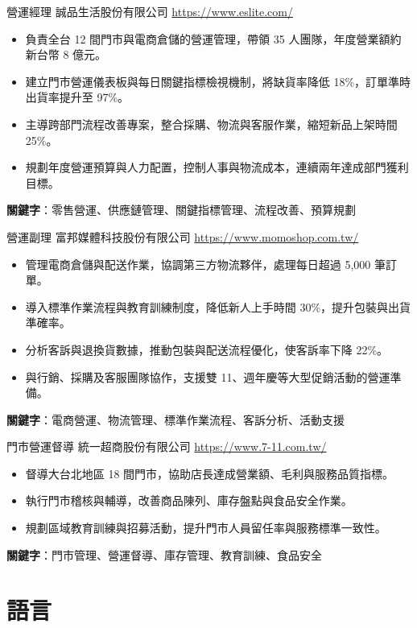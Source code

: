 \documentclass[a4paper, serif, 10pt]{moderncv}
\begin{document}
        {營運經理}
        {誠品生活股份有限公司}
        {\url{https://www.eslite.com/}}
        {}
        {\begin{itemize}
\item 負責全台 12 間門市與電商倉儲的營運管理，帶領 35 人團隊，年度營業額約新台幣 8 億元。
\item 建立門市營運儀表板與每日關鍵指標檢視機制，將缺貨率降低 18\%，訂單準時出貨率提升至 97\%。
\item 主導跨部門流程改善專案，整合採購、物流與客服作業，縮短新品上架時間 25\%。
\item 規劃年度營運預算與人力配置，控制人事與物流成本，連續兩年達成部門獲利目標。
\end{itemize}
\textbf{關鍵字}：零售營運、供應鏈管理、關鍵指標管理、流程改善、預算規劃}

        {營運副理}
        {富邦媒體科技股份有限公司}
        {\url{https://www.momoshop.com.tw/}}
        {}
        {\begin{itemize}
\item 管理電商倉儲與配送作業，協調第三方物流夥伴，處理每日超過 5,000 筆訂單。
\item 導入標準作業流程與教育訓練制度，降低新人上手時間 30\%，提升包裝與出貨準確率。
\item 分析客訴與退換貨數據，推動包裝與配送流程優化，使客訴率下降 22\%。
\item 與行銷、採購及客服團隊協作，支援雙 11、週年慶等大型促銷活動的營運準備。
\end{itemize}
\textbf{關鍵字}：電商營運、物流管理、標準作業流程、客訴分析、活動支援}

        {門市營運督導}
        {統一超商股份有限公司}
        {\url{https://www.7-11.com.tw/}}
        {}
        {\begin{itemize}
\item 督導大台北地區 18 間門市，協助店長達成營業額、毛利與服務品質指標。
\item 執行門市稽核與輔導，改善商品陳列、庫存盤點與食品安全作業。
\item 規劃區域教育訓練與招募活動，提升門市人員留任率與服務標準一致性。
\end{itemize}
\textbf{關鍵字}：門市管理、營運督導、庫存管理、教育訓練、食品安全}
\section{語言}

\end{document}
